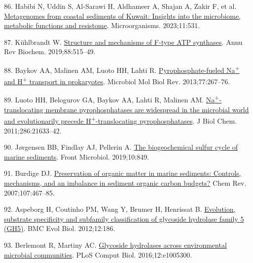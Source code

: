 \documentclass[
  12 pt,
]{article}
\newlength{\cslhangindent}
\newlength{\cslentryspacingunit} %
\newenvironment{CSLReferences}[2] %
 {%
  \setlength{\parindent}{0pt}
  \ifodd #1
  \let\oldpar\par
  \def\par{\hangindent=\cslhangindent\oldpar}
  \fi
  \setlength{\parskip}{#2\cslentryspacingunit}
 }%
 {}
\begin{document}
\begin{CSLReferences}{0}{0}
\leavevmode{}%
86. Habibi N, Uddin S, Al-Sarawi H, Aldhameer A, Shajan A, Zakir F, et al. \href{https://doi.org/10.3390/microorganisms11020531}{Metagenomes from coastal sediments of {Kuwait}: Insights into the microbiome, metabolic functions and resistome}. Microorganisms. 2023;11:531.

\leavevmode{}%
87. Kühlbrandt W. \href{https://doi.org/10.1146/annurev-biochem-013118-110903}{Structure and mechanisms of {F-type ATP} synthases}. Annu Rev Biochem. 2019;88:515--49.

\leavevmode{}%
88. Baykov AA, Malinen AM, Luoto HH, Lahti R. \href{https://doi.org/10.1128/mmbr.00003-13}{Pyrophosphate-fueled {Na}{\textsuperscript{+}} and {H}{\textsuperscript{+}} transport in prokaryotes}. Microbiol Mol Biol Rev. 2013;77:267--76.

\leavevmode{}%
89. Luoto HH, Belogurov GA, Baykov AA, Lahti R, Malinen AM. \href{https://doi.org/10.1074/jbc.M111.244483}{Na{\textsuperscript{+}}-translocating membrane pyrophosphatases are widespread in the microbial world and evolutionarily precede {H}{\textsuperscript{+}}-translocating pyrophosphatases}. J Biol Chem. 2011;286:21633--42.

\leavevmode{}%
90. Jørgensen BB, Findlay AJ, Pellerin A. \href{https://doi.org/10.3389/fmicb.2019.00849}{The biogeochemical sulfur cycle of marine sediments}. Front Microbiol. 2019;10:849.

\leavevmode{}%
91. Burdige DJ. \href{https://doi.org/10.1021/cr050347q}{Preservation of organic matter in marine sediments: Controls, mechanisms, and an imbalance in sediment organic carbon budgets?} Chem Rev. 2007;107:467--85.

\leavevmode{}%
92. Aspeborg H, Coutinho PM, Wang Y, Brumer H, Henrissat B. \href{https://doi.org/10.1186/1471-2148-12-186}{Evolution, substrate specificity and subfamily classification of glycoside hydrolase family 5 ({GH5})}. BMC Evol Biol. 2012;12:186.

\leavevmode{}%
93. Berlemont R, Martiny AC. \href{https://doi.org/10.1371/journal.pcbi.1005300}{Glycoside hydrolases across environmental microbial communities}. PLoS Comput Biol. 2016;12:e1005300.


\end{CSLReferences}
\end{document}
